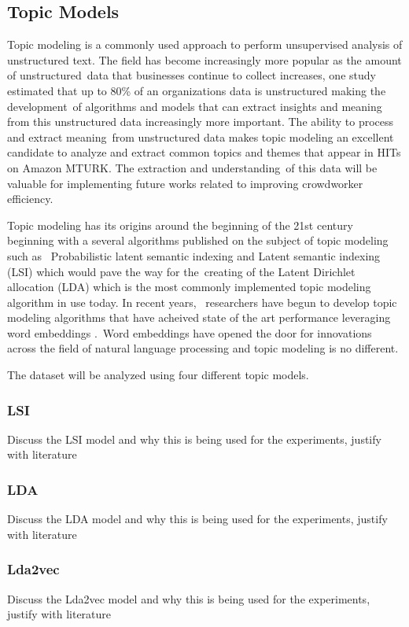 \documentclass[letterpaper,12pt]{article}
\begin{document}
\subsection{Topic Models}
Topic modeling is a commonly used approach to perform unsupervised analysis of unstructured text. The field has become increasingly more popular as the amount of unstructured\
data that businesses continue to collect increases, one study estimated that up to 80\% of an organizations data is unstructured \cite{Sint2009CombiningUF} making the development\
of algorithms and models that can extract insights and meaning from this unstructured data increasingly more important. The ability to process and extract meaning\
from unstructured data makes topic modeling an excellent candidate to analyze and extract common topics and themes that appear in HITs on Amazon MTURK. The extraction and understanding\
of this data will be valuable for implementing future works related to improving crowdworker efficiency.

Topic modeling has its origins around the beginning of the 21st century beginning with a several algorithms published on the subject of topic modeling such as \
Probabilistic latent semantic indexing \cite{hofmann1999probabilistic} and Latent semantic indexing \cite{papadimitriou2000latent} (LSI) which would pave the way for the\
creating of the Latent Dirichlet allocation (LDA) \cite{blei2003latent} which is the most commonly implemented topic modeling algorithm in use today. In recent years, \
researchers have begun to develop topic modeling algorithms that have acheived state of the art performance leveraging word embeddings \cite{mikolov2013distributed} \cite{dieng2019topic}.\
Word embeddings have opened the door for innovations across the field of natural language processing and topic modeling is no different. 

The dataset will be analyzed using four different topic models. 
\subsubsection{LSI}
Discuss the LSI model and why this is being used for the experiments, justify with literature
\subsubsection{LDA}
Discuss the LDA model and why this is being used for the experiments, justify with literature
\subsubsection{Lda2vec}
Discuss the Lda2vec model and why this is being used for the experiments, justify with literature
\end{document}

